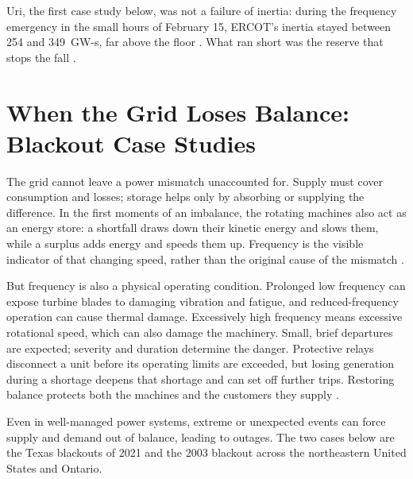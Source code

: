 Uri, the first case study below, was not a failure of inertia: during the frequency emergency in the small hours of February 15, ERCOT's inertia stayed between 254 and 349~\mbox{GW-s}, far above the floor \autocite{FERCNERCFeb2021}. %
What ran short was the reserve that stops the fall \autocite{FERCNERCFeb2021}. %

\section{When the Grid Loses Balance: Blackout Case Studies}

The grid cannot leave a power mismatch unaccounted for. Supply must cover consumption and losses; storage helps only by absorbing or supplying the difference. In the first moments of an imbalance, the rotating machines also act as an energy store: a shortfall draws down their kinetic energy and slows them, while a surplus adds energy and speeds them up. Frequency is the visible indicator of that changing speed, rather than the original cause of the mismatch \autocite{NERCBalancingFrequency2021}.

But frequency is also a physical operating condition. Prolonged low frequency can expose turbine blades to damaging vibration and fatigue, and reduced-frequency operation can cause thermal damage. Excessively high frequency means excessive rotational speed, which can also damage the machinery. Small, brief departures are expected; severity and duration determine the danger. Protective relays disconnect a unit before its operating limits are exceeded, but losing generation during a shortage deepens that shortage and can set off further trips. Restoring balance protects both the machines and the customers they supply \autocite{nerc2015protection,nerc2025largeloads}.

Even in well-managed power systems, extreme or unexpected events can force supply and demand out of balance, leading to outages. The two cases below are the Texas blackouts of 2021 and the 2003 blackout across the northeastern United States and Ontario.

